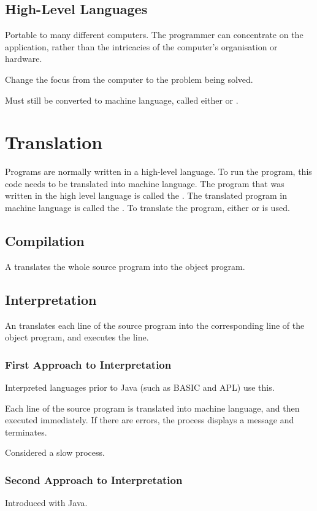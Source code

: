 \documentclass[\main/notes.tex]{subfiles}
\begin{document}
			\subsection{High-Level Languages}
				Portable to many different computers. The programmer can concentrate on the application, rather than the intricacies of the computer's organisation or hardware.

				Change the focus from the computer to the problem being solved.

				Must still be converted to machine language, called either  or .

		\section{Translation}
			Programs are normally written in a high-level language. To run the program, this code needs to be translated into machine language. The program that was written in the high level language is called the . The translated program in machine language is called the . To translate the program, either  or  is used.

			\subsection{Compilation}
				A  translates the whole source program into the object program.

			\subsection{Interpretation}
				An  translates each line of the source program into the corresponding line of the object program, and executes the line.

				\subsubsection{First Approach to Interpretation}
					Interpreted languages prior to Java (such as BASIC and APL) use this.

					Each line of the source program is translated into machine language, and then executed immediately. If there are errors, the process displays a message and terminates.

					Considered a slow process.
				\subsubsection{Second Approach to Interpretation}
					Introduced with Java.
\end{document}
